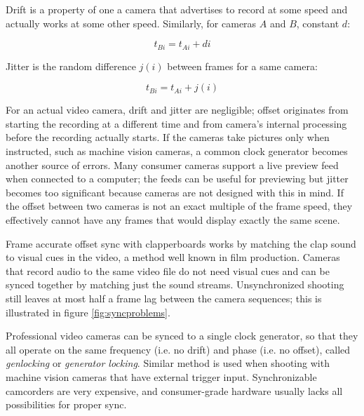Drift is a property of one a camera that advertises to record at some speed and actually works at some other speed. Similarly, for cameras $A$ and $B$, constant $d$:

\begin{equation} \label{eq:timedrift}
	t_{Bi} = t_{Ai} + d i
\end{equation}

Jitter is the random difference $j(i)$ between frames for a same camera:

\begin{equation} \label{eq:timejitter}
	t_{Bi} = t_{Ai} + j(i)
\end{equation}

For an actual video camera, drift and jitter are negligible; offset originates from starting the recording at a different time and from camera's internal processing before the recording actually starts.
If the cameras take pictures only when instructed, such as machine vision cameras, a common clock generator becomes another source of errors.
Many consumer cameras support a live preview feed when connected to a computer; the feeds can be useful for previewing but jitter becomes too significant because cameras are not designed with this in mind.
If the offset between two cameras is not an exact multiple of the frame speed, they effectively cannot have any frames that would display exactly the same scene.

Frame accurate offset sync with clapperboards works by matching the clap sound to visual cues in the video, a method well known in film production.
Cameras that record audio to the same video file do not need visual cues and can be synced together by matching just the sound streams.
Unsynchronized shooting still leaves at most half a frame lag between the camera sequences; this is illustrated in figure \ref{fig:syncproblems}.

Professional video cameras can be synced to a single clock generator, so that they all operate on the same frequency (i.e. no drift) and phase (i.e. no offset), called \emph{genlocking} or \emph{generator locking}.
Similar method is used when shooting with machine vision cameras that have external trigger input.
Synchronizable camcorders are very expensive, and consumer-grade hardware usually lacks all possibilities for proper sync.

%
%
%
%

